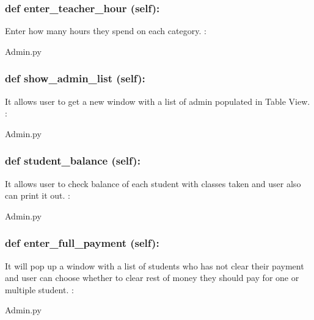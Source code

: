 \hypertarget{class_poly_a14a7ad77ce612b0c54f531d307ee4b39}{
\subsubsection[{def enter_teacher_hour(self):}]{\setlength{\rightskip}{0pt plus 5cm}def {enter\_teacher\_hour} (self):}}\label{class_poly_a14a7ad77ce612b0c54f531d307ee4b39}
Enter how many hours they spend on each category.
:\begin{DoxyCompactItemize}
\item 
Admin.\-py\end{DoxyCompactItemize}

\hypertarget{class_poly_a14a7ad77ce612b0c54f531d307ee4b39}{
\subsubsection[{def show_admin_list(self):}]{\setlength{\rightskip}{0pt plus 5cm}def {show\_admin\_list} (self):}}\label{class_poly_a14a7ad77ce612b0c54f531d307ee4b39}
It allows user to get a new window with a list of admin populated in Table View.
:\begin{DoxyCompactItemize}
\item 
Admin.\-py\end{DoxyCompactItemize}


\hypertarget{class_poly_a14a7ad77ce612b0c54f531d307ee4b39}{
\subsubsection[{def student_balance(self):}]{\setlength{\rightskip}{0pt plus 5cm}def {student\_balance} (self):}}\label{class_poly_a14a7ad77ce612b0c54f531d307ee4b39}
It allows user to check balance of each student with classes taken and user also can print it out.
:\begin{DoxyCompactItemize}
\item 
Admin.\-py\end{DoxyCompactItemize}

\hypertarget{class_poly_a14a7ad77ce612b0c54f531d307ee4b39}{
\subsubsection[{def enter_full_payment(self):}]{\setlength{\rightskip}{0pt plus 5cm}def {enter\_full\_payment} (self):}}\label{class_poly_a14a7ad77ce612b0c54f531d307ee4b39}
It will pop up a window with a list of students who has not clear their payment and user can choose whether to clear rest of money they should pay for one or multiple student.
:\begin{DoxyCompactItemize}
\item 
Admin.\-py\end{DoxyCompactItemize}

